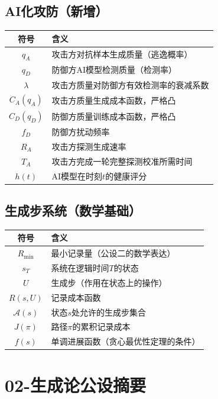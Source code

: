 \documentclass[11pt,a4paper]{article}
\begin{document}
\subsection{AI化攻防（新增）}

\begin{center}
\begin{xltabular}{\textwidth}{c|X}
\toprule
\textbf{符号} & \textbf{含义} \\
\midrule
$q_A$ & 攻击方对抗样本生成质量（逃逸概率） \\
$q_D$ & 防御方AI模型检测质量（检测率） \\
$\lambda$ & 攻击方质量对防御方有效检测率的衰减系数 \\
$C_A(q_A)$ & 攻击方质量生成成本函数，严格凸 \\
$C_D(q_D)$ & 防御方质量训练成本函数，严格凸 \\
$f_D$ & 防御方扰动频率 \\
$R_A$ & 攻击方探测生成速率 \\
$T_A$ & 攻击方完成一轮完整探测校准所需时间 \\
$h(t)$ & AI模型在时刻$t$的健康评分 \\
\bottomrule
\end{xltabular}
\end{center}

\subsection{生成步系统（数学基础）}

\begin{center}
\begin{xltabular}{\textwidth}{c|X}
\toprule
\textbf{符号} & \textbf{含义} \\
\midrule
$R_{\min}$ & 最小记录量（公设二的数学表达） \\
$s_T$ & 系统在逻辑时间$T$的状态 \\
$U$ & 生成步（作用在状态上的操作） \\
$R(s,U)$ & 记录成本函数 \\
$\mathcal{A}(s)$ & 状态$s$处允许的生成步集合 \\
$J(\pi)$ & 路径$\pi$的累积记录成本 \\
$f(s)$ & 单调进展函数（贪心最优性定理的条件） \\
\bottomrule
\end{xltabular}
\end{center}

\section{02-生成论公设摘要}
\end{document}
